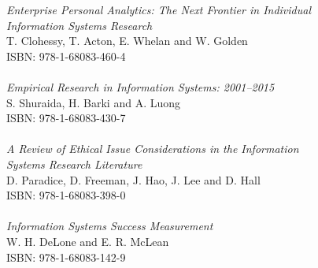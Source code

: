 \vspace{12pt}
\noindent \textit{Enterprise Personal Analytics: The Next Frontier in Individual\\ Information Systems Research}\\
T. Clohessy, T. Acton, E. Whelan and W. Golden\\
ISBN: 978-1-68083-460-4\\
\\
\noindent \textit{Empirical Research in Information Systems: 2001–2015}\\
S. Shuraida, H. Barki and A. Luong\\
ISBN: 978-1-68083-430-7\\
\\
\noindent \textit{A Review of Ethical Issue Considerations in the Information\\ Systems Research Literature}\\
D. Paradice, D. Freeman, J. Hao, J. Lee and D. Hall\\
ISBN: 978-1-68083-398-0\\
\\
\noindent \textit{Information Systems Success Measurement}\\
W. H. DeLone and E. R. McLean\\
ISBN: 978-1-68083-142-9